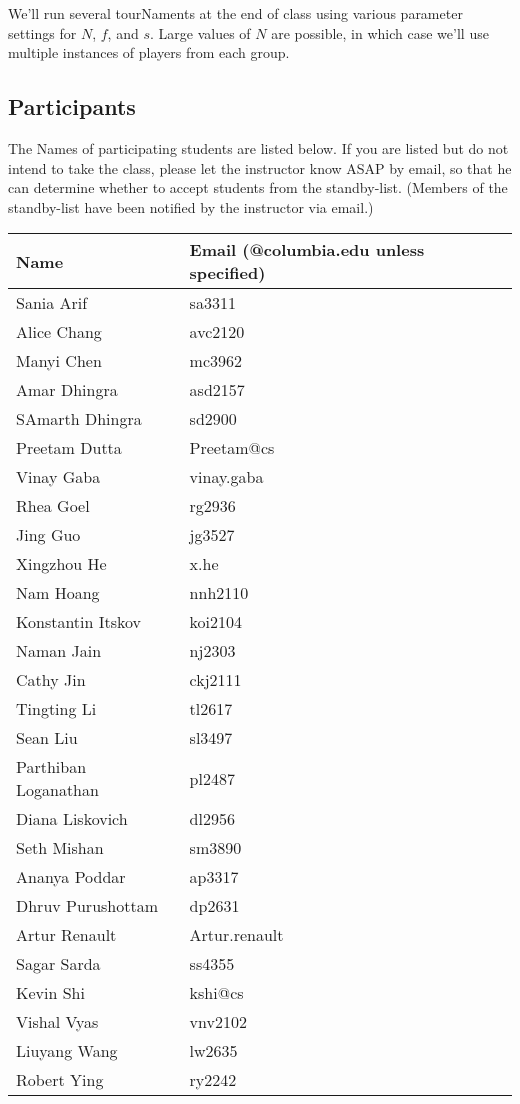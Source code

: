 We'll run several tourNaments at the end of class using various
parameter settings for $N$, $f$, and $s$. Large values of $N$ are
possible, in which case we'll use multiple instances of players from
each group.

\subsection{Participants}

The Names of participating students are listed below.  If you are listed but do not intend to
take the class, please let the instructor know ASAP by email, so that
he can determine whether to accept students from the standby-list.
(Members of the standby-list have been notified by the instructor via email.)

\begin{tabular}{ll}
Name & Email (@columbia.edu unless specified) \\ \hline
Sania Arif & sa3311 \\
Alice Chang & avc2120 \\
Manyi Chen & mc3962 \\
Amar Dhingra & asd2157 \\
SAmarth Dhingra & sd2900 \\
Preetam Dutta & Preetam@cs \\
Vinay Gaba & vinay.gaba \\
Rhea Goel & rg2936 \\
Jing Guo & jg3527 \\
Xingzhou He & x.he \\
Nam Hoang & nnh2110 \\
Konstantin Itskov & koi2104 \\
Naman Jain & nj2303 \\
Cathy Jin & ckj2111 \\
Tingting Li & tl2617 \\
Sean Liu & sl3497 \\
Parthiban Loganathan & pl2487 \\
Diana Liskovich & dl2956 \\
Seth Mishan & sm3890 \\
Ananya Poddar & ap3317 \\
Dhruv Purushottam & dp2631 \\
Artur Renault & Artur.renault \\
Sagar Sarda & ss4355 \\
Kevin Shi & kshi@cs \\
Vishal Vyas & vnv2102 \\
Liuyang Wang & lw2635 \\
Robert Ying & ry2242 \\
\end{tabular}

